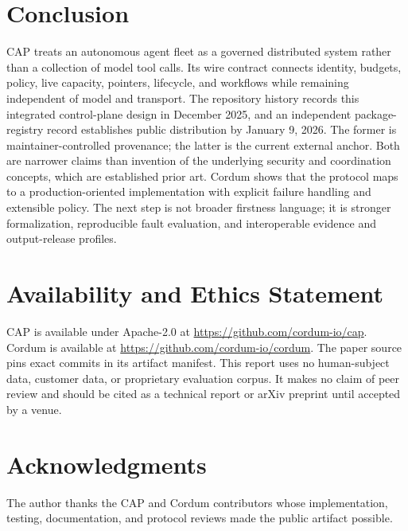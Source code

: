 \section{Conclusion}

CAP treats an autonomous agent fleet as a governed distributed system rather than a collection of model tool calls. Its wire contract connects identity, budgets, policy, live capacity, pointers, lifecycle, and workflows while remaining independent of model and transport. The repository history records this integrated control-plane design in December 2025, and an independent package-registry record establishes public distribution by January 9, 2026. The former is maintainer-controlled provenance; the latter is the current external anchor. Both are narrower claims than invention of the underlying security and coordination concepts, which are established prior art. Cordum shows that the protocol maps to a production-oriented implementation with explicit failure handling and extensible policy. The next step is not broader firstness language; it is stronger formalization, reproducible fault evaluation, and interoperable evidence and output-release profiles.

\section*{Availability and Ethics Statement}

CAP is available under Apache-2.0 at \url{https://github.com/cordum-io/cap}. Cordum is available at \url{https://github.com/cordum-io/cordum}. The paper source pins exact commits in its artifact manifest. This report uses no human-subject data, customer data, or proprietary evaluation corpus. It makes no claim of peer review and should be cited as a technical report or arXiv preprint until accepted by a venue.

\section*{Acknowledgments}

The author thanks the CAP and Cordum contributors whose implementation, testing, documentation, and protocol reviews made the public artifact possible.
